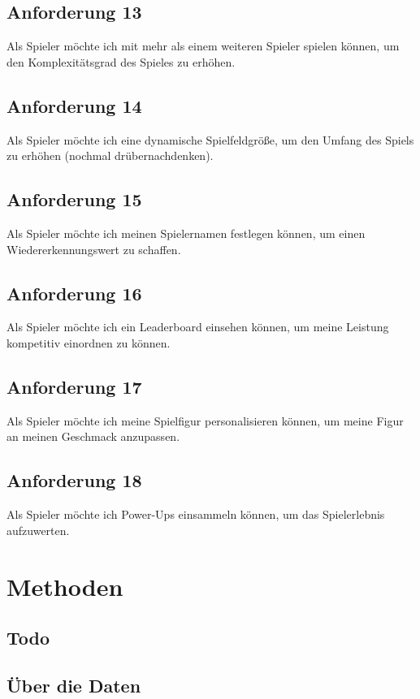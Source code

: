 \documentclass[conference]{IEEEtran}
\begin{document}
\subsection{Anforderung 13}
Als Spieler möchte ich mit mehr als einem weiteren Spieler spielen können, um den Komplexitätsgrad des Spieles zu erhöhen.

\subsection{Anforderung 14}
Als Spieler möchte ich eine dynamische Spielfeldgröße, um den Umfang des Spiels zu erhöhen (nochmal drübernachdenken).

\subsection{Anforderung 15}
Als Spieler möchte ich meinen Spielernamen festlegen können, um einen Wiedererkennungswert zu schaffen.

\subsection{Anforderung 16}
Als Spieler möchte ich ein Leaderboard einsehen können, um meine Leistung kompetitiv einordnen zu können.

\subsection{Anforderung 17}
Als Spieler möchte ich meine Spielfigur personalisieren können, um meine Figur an meinen Geschmack anzupassen.

\subsection{Anforderung 18}
Als Spieler möchte ich Power-Ups einsammeln können, um das Spielerlebnis aufzuwerten.

\section{Methoden}

\subsection*{Todo}

\subsection*{Über die Daten}
\end{document}
